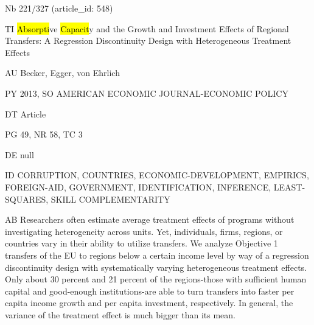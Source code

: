 \documentclass[a4paper]{article}
\begin{document}
\vspace*{-2cm}
Nb \tabto{0cm}221/327 (article\_id: 548)\par
TI \tabto{0cm}\hl{Absorpti}ve \hl{Capacit}y and the Growth and Investment Effects of Regional Transfers: A Regression Discontinuity Design with Heterogeneous Treatment Effects\par
AU \tabto{0cm}Becker, Egger, von Ehrlich\par
PY \tabto{0cm}2013, SO AMERICAN ECONOMIC JOURNAL-ECONOMIC POLICY\par
DT \tabto{0cm}Article\par
PG \tabto{0cm}49, NR 58, TC 3\par
DE \tabto{0cm}null\par
ID \tabto{0cm}CORRUPTION, COUNTRIES, ECONOMIC-DEVELOPMENT, EMPIRICS, FOREIGN-AID, GOVERNMENT, IDENTIFICATION, INFERENCE, LEAST-SQUARES, SKILL COMPLEMENTARITY\par
AB \tabto{0cm}Researchers often estimate average treatment effects of programs without investigating heterogeneity across units. Yet, individuals, firms, regions, or countries vary in their ability to utilize transfers. We analyze Objective 1 transfers of the EU to regions below a certain income level by way of a regression discontinuity design with systematically varying heterogeneous treatment effects. Only about 30 percent and 21 percent of the regions-those with sufficient human capital and good-enough institutions-are able to turn transfers into faster per capita income growth and per capita investment, respectively. In general, the variance of the treatment effect is much bigger than its mean.\par
\clearpage
\end{document}
